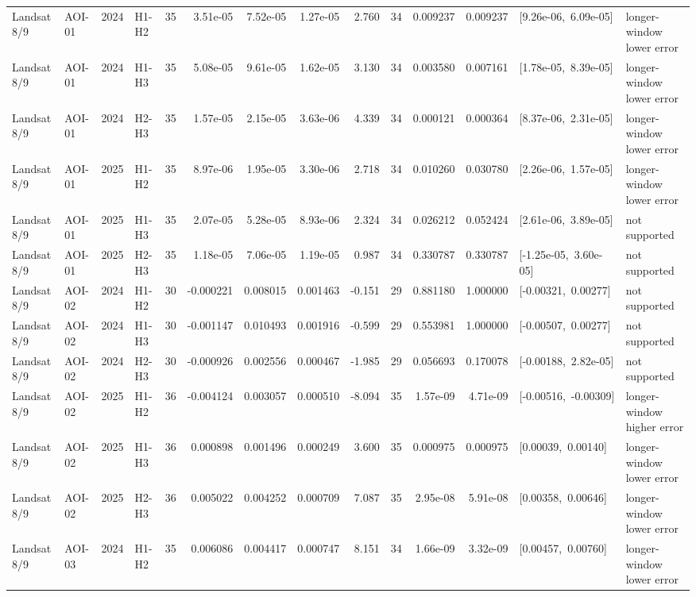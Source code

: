 \begin{landscape}
\begin{longtable}{llclrrrrrrrrp{2.35cm}p{1.75cm}}
Landsat 8/9 & AOI-01 & 2024 & H1-H2 & 35 & 3.51e-05 & 7.52e-05 & 1.27e-05 & 2.760 & 34 & 0.009237 & 0.009237 & \mbox{[9.26e-06, 6.09e-05]} & longer-window lower error \\
Landsat 8/9 & AOI-01 & 2024 & H1-H3 & 35 & 5.08e-05 & 9.61e-05 & 1.62e-05 & 3.130 & 34 & 0.003580 & 0.007161 & \mbox{[1.78e-05, 8.39e-05]} & longer-window lower error \\
Landsat 8/9 & AOI-01 & 2024 & H2-H3 & 35 & 1.57e-05 & 2.15e-05 & 3.63e-06 & 4.339 & 34 & 0.000121 & 0.000364 & \mbox{[8.37e-06, 2.31e-05]} & longer-window lower error \\
Landsat 8/9 & AOI-01 & 2025 & H1-H2 & 35 & 8.97e-06 & 1.95e-05 & 3.30e-06 & 2.718 & 34 & 0.010260 & 0.030780 & \mbox{[2.26e-06, 1.57e-05]} & longer-window lower error \\
Landsat 8/9 & AOI-01 & 2025 & H1-H3 & 35 & 2.07e-05 & 5.28e-05 & 8.93e-06 & 2.324 & 34 & 0.026212 & 0.052424 & \mbox{[2.61e-06, 3.89e-05]} & not supported \\
Landsat 8/9 & AOI-01 & 2025 & H2-H3 & 35 & 1.18e-05 & 7.06e-05 & 1.19e-05 & 0.987 & 34 & 0.330787 & 0.330787 & \mbox{[-1.25e-05, 3.60e-05]} & not supported \\
Landsat 8/9 & AOI-02 & 2024 & H1-H2 & 30 & -0.000221 & 0.008015 & 0.001463 & -0.151 & 29 & 0.881180 & 1.000000 & \mbox{[-0.00321, 0.00277]} & not supported \\
Landsat 8/9 & AOI-02 & 2024 & H1-H3 & 30 & -0.001147 & 0.010493 & 0.001916 & -0.599 & 29 & 0.553981 & 1.000000 & \mbox{[-0.00507, 0.00277]} & not supported \\
Landsat 8/9 & AOI-02 & 2024 & H2-H3 & 30 & -0.000926 & 0.002556 & 0.000467 & -1.985 & 29 & 0.056693 & 0.170078 & \mbox{[-0.00188, 2.82e-05]} & not supported \\
Landsat 8/9 & AOI-02 & 2025 & H1-H2 & 36 & -0.004124 & 0.003057 & 0.000510 & -8.094 & 35 & 1.57e-09 & 4.71e-09 & \mbox{[-0.00516, -0.00309]} & longer-window higher error \\
Landsat 8/9 & AOI-02 & 2025 & H1-H3 & 36 & 0.000898 & 0.001496 & 0.000249 & 3.600 & 35 & 0.000975 & 0.000975 & \mbox{[0.00039, 0.00140]} & longer-window lower error \\
Landsat 8/9 & AOI-02 & 2025 & H2-H3 & 36 & 0.005022 & 0.004252 & 0.000709 & 7.087 & 35 & 2.95e-08 & 5.91e-08 & \mbox{[0.00358, 0.00646]} & longer-window lower error \\
Landsat 8/9 & AOI-03 & 2024 & H1-H2 & 35 & 0.006086 & 0.004417 & 0.000747 & 8.151 & 34 & 1.66e-09 & 3.32e-09 & \mbox{[0.00457, 0.00760]} & longer-window lower error \\

\end{longtable}
\end{landscape}
